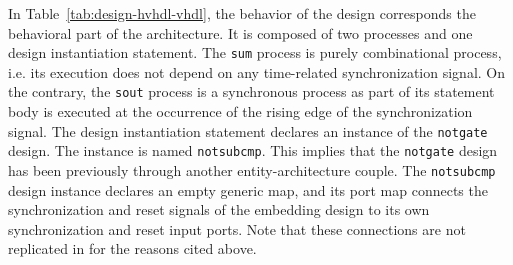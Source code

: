 \documentclass[pdflatex,sn-mathphys]{sn-jnl}%
\theoremstyle{thmstyleone}%
\theoremstyle{thmstyletwo}%
\theoremstyle{thmstylethree}%
\begin{document}
In Table~\ref{tab:design-hvhdl-vhdl}, the behavior of the design
corresponds the behavioral part of the architecture. It is composed of
two processes and one design instantiation statement. The \texttt{sum}
process is purely combinational process, i.e. its execution does not
depend on any time-related synchronization signal. On the contrary,
the \texttt{sout} process is a synchronous process as part of its
statement body is executed at the occurrence of the rising edge of the
synchronization signal. The design instantiation statement declares an
instance of the \texttt{notgate} design. The instance is named
\texttt{notsubcmp}. This implies that the \texttt{notgate} design has
been previously through another entity-architecture couple. The
\texttt{notsubcmp} design instance declares an empty generic map, and
its port map connects the synchronization and reset signals of the
embedding design to its own synchronization and reset input
ports. Note that these connections are not replicated in \hvhdl{} for
the reasons cited above.
\end{document}

